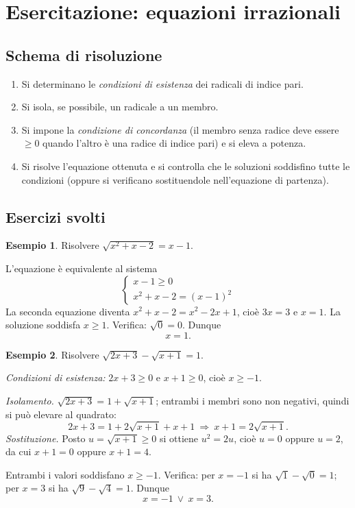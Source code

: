 \documentclass[12pt,a4paper,openany]{book}
\theoremstyle{definition}
\newtheorem{esempio}{Esempio}[section]
\theoremstyle{plain}
\theoremstyle{remark}
\newcommand{\sistema}[1]{\begin{cases}#1\end{cases}}
\begin{document}
\section{Esercitazione: equazioni irrazionali}

\subsection*{Schema di risoluzione}

\begin{enumerate}[label=\arabic*)]
\item Si determinano le \emph{condizioni di esistenza} dei radicali di indice pari.
\item Si isola, se possibile, un radicale a un membro.
\item Si impone la \emph{condizione di concordanza} (il membro senza radice deve essere $\ge 0$ quando l'altro è una radice di indice pari) e si eleva a potenza.
\item Si risolve l'equazione ottenuta e si controlla che le soluzioni soddisfino tutte le condizioni (oppure si verificano sostituendole nell'equazione di partenza).
\end{enumerate}

\subsection*{Esercizi svolti}

\begin{esempio}
Risolvere $\sqrt{x^2+x-2}=x-1$.

L'equazione è equivalente al sistema
\[
\sistema{x-1\ge 0\\ x^2+x-2=(x-1)^2}
\]
La seconda equazione diventa $x^2+x-2=x^2-2x+1$, cioè $3x=3$ e $x=1$. La soluzione soddisfa $x\ge 1$. Verifica: $\sqrt{0}=0$. Dunque
\[
x=1.
\]
\end{esempio}

\begin{esempio}
Risolvere $\sqrt{2x+3}-\sqrt{x+1}=1$.

\emph{Condizioni di esistenza:} $2x+3\ge 0$ e $x+1\ge 0$, cioè $x\ge -1$.

\emph{Isolamento.} $\sqrt{2x+3}=1+\sqrt{x+1}$; entrambi i membri sono non negativi, quindi si può elevare al quadrato:
\[
2x+3=1+2\sqrt{x+1}+x+1\ \Longrightarrow\ x+1=2\sqrt{x+1}.
\]
\emph{Sostituzione.} Posto $u=\sqrt{x+1}\ge 0$ si ottiene $u^2=2u$, cioè $u=0$ oppure $u=2$, da cui $x+1=0$ oppure $x+1=4$.

Entrambi i valori soddisfano $x\ge -1$. Verifica: per $x=-1$ si ha $\sqrt1-\sqrt0=1$; per $x=3$ si ha $\sqrt9-\sqrt4=1$. Dunque
\[
x=-1\ \lor\ x=3.
\]
\end{esempio}
\end{document}
